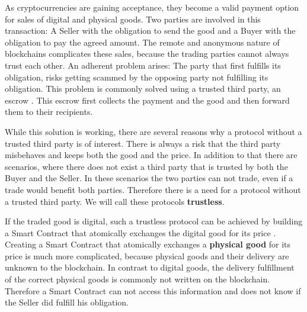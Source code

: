 \documentclass{cacthesis}
\begin{document}
	As cryptocurrencies are gaining acceptance, they become a valid payment option for sales of digital and physical goods. Two parties are involved in this transaction: A Seller with the obligation to send the good and a Buyer with the obligation to pay the agreed amount. The remote and anonymous nature of blockchains complicates these sales, because the trading parties cannot always trust each other. An adherent problem arises: 
	The party that first fulfills its obligation, risks getting scammed by the opposing party not fulfilling its obligation.
	This problem is commonly solved using a trusted third party, an escrow \cite{kiayias_escrow_2017}. This escrow first collects the payment and the good and then forward them to their recipients. \newline 
	
	While this solution is working, there are several reasons why a protocol without a trusted third party is of interest. There is always a risk that the third party misbehaves and keeps both the good and the price. In addition to that there are scenarios, where there does not exist a third party that is trusted by both the Buyer and the Seller. In these scenarios the two parties can not trade, even if a trade would benefit both parties. Therefore there is a need for a protocol without a trusted third party. We will call these protocols \textbf{trustless}.\newline
	
	If the traded good is digital, such a trustless protocol can be achieved by building a Smart Contract that atomically exchanges the digital good for its price \cite{asgaonkar_solving_2019}. Creating a Smart Contract that atomically exchanges a \textbf{physical good} for its price is much more complicated, because physical goods and their delivery are unknown to the blockchain. In contrast to digital goods, the delivery fulfillment of the correct physical goods is commonly not written on the blockchain. Therefore a Smart Contract can not access this information and does not know if the Seller did fulfill his obligation. \newline
	
\end{document}
